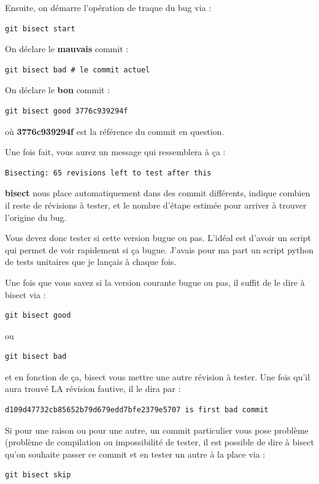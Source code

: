\documentclass[a4paper,twoside]{article}
\begin{document}
Ensuite, on démarre l'opération de traque du bug via :
\begin{verbatim}
git bisect start
\end{verbatim}

On déclare le \textbf{mauvais} commit :
\begin{verbatim}
git bisect bad # le commit actuel
\end{verbatim}

On déclare le \textbf{bon} commit : 
\begin{verbatim}
git bisect good 3776c939294f
\end{verbatim}
où \textbf{3776c939294f} est la référence du commit en question. 

\bigskip

Une fois fait, vous aurez un message qui ressemblera à ça :
\begin{verbatim}
Bisecting: 65 revisions left to test after this
\end{verbatim}

\textbf{bisect} nous place automatiquement dans des commit différents, indique combien il reste de révisions à tester, et le nombre d'étape estimée pour arriver à trouver l'origine du bug. 

Vous devez donc tester si cette version bugue ou pas. L'idéal est d'avoir un script qui permet de voir rapidement si ça bugue. J'avais pour ma part un script python de tests unitaires que je lançais à chaque fois. 

Une fois que vous savez si la version courante bugue ou pas, il suffit de le dire à bisect via : 
\begin{verbatim}
git bisect good
\end{verbatim}
ou
\begin{verbatim}
git bisect bad
\end{verbatim}
et en fonction de ça, bisect vous mettre une autre révision à tester. Une fois qu'il aura trouvé LA révision fautive, il le dira par :
\begin{verbatim}
d109d47732cb85652b79d679edd7bfe2379e5707 is first bad commit
\end{verbatim}

\begin{attention}
Si pour une raison ou pour une autre, un commit particulier vous pose problème (problème de compilation ou impossibilité de tester, il est possible de dire à bisect qu'on souhaite passer ce commit et en tester un autre à la place via :
\begin{verbatim}
git bisect skip
\end{verbatim}
\end{attention}
\end{document}
